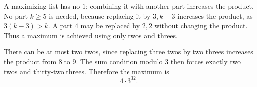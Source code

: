 A maximizing list has no $1$: combining it with another part increases the product. No part $k\ge5$ is needed, because replacing it by $3,k-3$ increases the product, as $3(k-3)>k$. A part $4$ may be replaced by $2,2$ without changing the product. Thus a maximum is achieved using only twos and threes.

There can be at most two twos, since replacing three twos by two threes increases the product from $8$ to $9$. The sum condition modulo $3$ then forces exactly two twos and thirty-two threes. Therefore the maximum is
\[
\boxed{4\cdot3^{32}}.
\]
